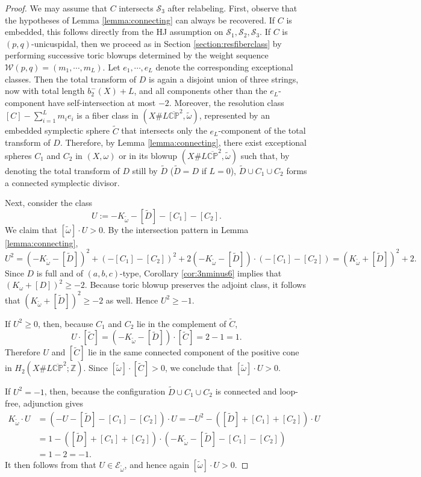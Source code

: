 \documentclass[11pt]{article}
\theoremstyle{definition}
\theoremstyle{remark}
\newcommand{\CP}{\mathbb{CP}}
\newcommand{\Z}{\mathbb{Z}}
\newcommand{\st}{\mathcal{S}}
\begin{document}
\begin{proof}
  We may assume that $C$ intersects $\st_3$ after relabeling. First, observe that the hypotheses of Lemma \ref{lemma:connecting} can always be recovered. If $C$ is embedded, this follows directly from the HJ assumption on $\st_1,\st_2,\st_3$. If $C$ is $(p,q)$-unicuspidal, then we proceed as in Section \ref{section:resfiberclass} by performing successive toric blowups determined by the weight sequence $\mathcal{W}(p,q)=(m_1,\cdots,m_L)$. Let $e_1,\cdots,e_L$ denote the corresponding exceptional classes. Then the total transform of $D$ is again a disjoint union of three strings, now with total length $b_2^-(X)+L$, and all components other than the $e_L$-component have self-intersection at most $-2$. Moreover, the resolution class $[C]-\sum_{i=1}^L m_i e_i$ is a fiber class in $(X\#L\overline{\CP}^2,\tilde{\omega})$, represented by an embedded symplectic sphere $\tilde{C}$ that intersects only the $e_L$-component of the total transform of $D$. Therefore, by Lemma \ref{lemma:connecting}, there exist exceptional spheres $C_1$ and $C_2$ in $(X,\omega)$ or in its blowup $(X\#L\overline{\CP}^2,\tilde{\omega})$ such that, by denoting the total transform of $D$ still by $\tilde{D}$ ($\tilde{D}=D$ if $L=0$), $\tilde{D}\cup C_1\cup C_2$ forms a connected symplectic divisor.
  
Next, consider the class
\[
  U:=-K_{\tilde{\omega}}-[\tilde{D}]-[C_1]-[C_2].
\]
We claim that $[\tilde{\omega}]\cdot U>0$. By the intersection pattern in Lemma \ref{lemma:connecting},
\[
  U^2=(-K_{\tilde{\omega}}-[\tilde{D}])^2+(-[C_1]-[C_2])^2+2(-K_{\tilde{\omega}}-[\tilde{D}])\cdot(-[C_1]-[C_2])
  =(K_{\tilde{\omega}}+[\tilde{D}])^2+2.
\]
Since $D$ is full and of $(a,b,c)$-type, Corollary \ref{cor:3nminus6} implies that $(K_{\omega}+[D])^2\geq -2$. Because toric blowup preserves the adjoint class, it follows that $(K_{\tilde{\omega}}+[\tilde{D}])^2\geq -2$ as well. Hence $U^2\geq -1$.

If $U^2\geq 0$, then, because $C_1$ and $C_2$ lie in the complement of $\tilde{C}$,
\[
  U\cdot [\tilde{C}]=(-K_{\tilde{\omega}}-[\tilde{D}])\cdot [\tilde{C}]=2-1=1.
\]
Therefore $U$ and $[\tilde{C}]$ lie in the same connected component of the positive cone in $H_2(X\#L\overline{\CP}^2;\Z)$. Since $[\tilde{\omega}]\cdot[\tilde{C}]>0$, we conclude that $[\tilde{\omega}]\cdot U>0$.

If $U^2=-1$, then, because the configuration $\tilde{D}\cup C_1\cup C_2$ is connected and loop-free, adjunction gives
\begin{align*}
  K_{\tilde{\omega}}\cdot U&=(-U-[\tilde{D}]-[C_1]-[C_2])\cdot U=-U^2-([\tilde{D}]+[C_1]+[C_2])\cdot U\\
  &=1-([\tilde{D}]+[C_1]+[C_2])\cdot (-K_{\tilde{\omega}}-[\tilde{D}]-[C_1]-[C_2])\\
  &=1-2=-1.
\end{align*}
It then follows from \cite[Theorem A]{LiLiu96} that $U\in \mathcal{E}_{\tilde{\omega}}$, and hence again $[\tilde{\omega}]\cdot U>0$.
 

\end{proof}
\end{document}
